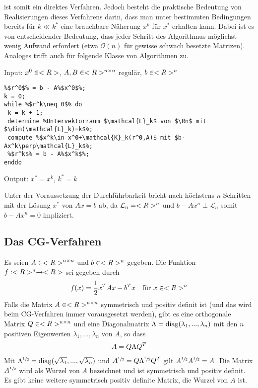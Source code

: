  ist somit ein direktes Verfahren. Jedoch besteht die praktische Bedeutung von Realisierungen dieses Verfahrens darin, dass man unter bestimmten Bedingungen bereits für $k\ll k^\ast$ eine brauchbare Näherung $x^k$ für $x^\ast$ erhalten kann. Dabei ist es von entscheidender Bedeutung, dass jeder Schritt des Algorithmus möglichst wenig Aufwand erfordert (etwa $\mathcal{O}(n)$ für gewisse schwach besetzte Matrizen). Analoges trifft auch für folgende Klasse von Algorithmen zu.

\begin{algorithm}
	Input: $x^0\in<R>$, $A,B\in<R>^{n \times n}$ regulär, $b\in<R>^n$
	\begin{lstlisting}
%$r^0$% = b - A%$x^0$%;
k = 0;
while %$r^k\neq 0$% do
 k = k + 1;
 determine %Untervektorraum $\mathcal{L}_k$ von $\Rn$ mit $\dim(\mathcal{L}_k)=k$%;
 compute %$x^k\in x^0+\mathcal{K}_k(r^0,A)$ mit $b-Ax^k\perp\mathcal{L}_k$%;
 %$r^k$% = b - A%$x^k$%;
enddo
	\end{lstlisting}
	Output: $x^\ast=x^k$, $k^\ast=k$
\end{algorithm}

Unter der Voraussetzung der Durchführbarkeit bricht  nach höchstens $n$ Schritten mit der Lösung $x^\ast$ von $Ax=b$ ab, da $\mathcal{L}_n=<R>^n$ und $b-Ax^n\perp\mathcal{L}_n$ somit $b-Ax^n=0$ impliziert.

\subsection{Das CG-Verfahren}

Es seien $A\in<R>^{n \times n}$ und $b\in<R>^n$ gegeben. Die Funktion $f:<R>^n\to<R>$ sei gegeben durch
\begin{align}
	f(x) = \frac{1}{2}x^TAx-b^Tx\quad\text{für } x\in<R>^n\notag
\end{align}
Falls die Matrix $A\in<R>^{n \times n}$ symmetrisch und positiv definit ist (und das wird beim CG-Verfahren immer vorausgesetzt werden), gibt es eine orthogonale Matrix $Q\in<R>^{n \times n}$ und eine Diagonalmatrix $\Lambda=\operatorname{diag}(\lambda_1,...,\lambda_n)$ mit den $n$ positiven Eigenwerten $\lambda_1,...,\lambda_n$ von $A$, so dass
\begin{align}
	A = Q\Lambda Q^T\notag
\end{align}
Mit $\Lambda^{\sfrac{1}{2}}=\operatorname{diag}(\sqrt{\lambda_1},...,\sqrt{\lambda_n})$ und $A^{\sfrac{1}{2}}=Q\Lambda^{\sfrac{1}{2}}Q^T$ gilt $A^{\sfrac{1}{2}}A^{\sfrac{1}{2}}=A$. Die Matrix $A^{\sfrac{1}{2}}$ wird als Wurzel von $A$ bezeichnet und ist symmetrisch und positiv definit. Es gibt keine weitere symmetrisch positiv definite Matrix, die Wurzel von $A$ ist.

